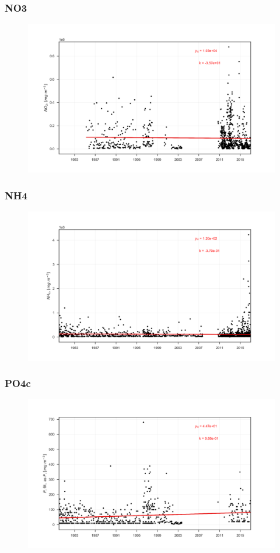 \documentclass{beamer}
\begin{document}
\begin{frame}
\frametitle{NO3}
\begin{figure}
\includegraphics[width=\textwidth]{rivers/all/all_years/NO3.png}
\end{figure}
\end{frame}

\begin{frame}
\frametitle{NH4}
\begin{figure}
\includegraphics[width=\textwidth]{rivers/all/all_years/NH4.png}
\end{figure}
\end{frame}

\begin{frame}
\frametitle{PO4c}
\begin{figure}
\includegraphics[width=\textwidth]{rivers/all/all_years/PO4c.png}
\end{figure}
\end{frame}
\end{document}

